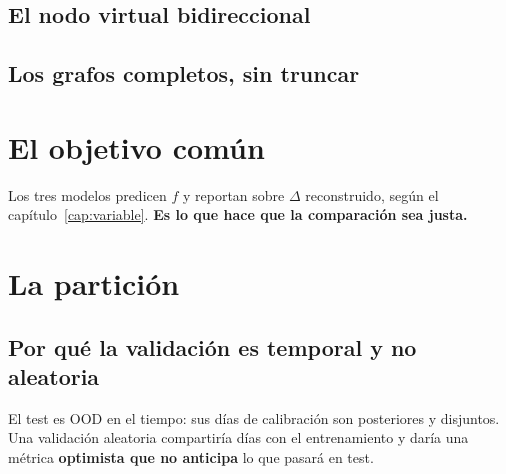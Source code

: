 \subsection{El nodo virtual bidireccional}

\subsection{Los grafos completos, sin truncar}


\section{El objetivo común}
\label{sec:objetivo_comun}
Los tres modelos predicen $f$ y reportan sobre $\Delta$ reconstruido, según el
capítulo~\ref{cap:variable}. \textbf{Es lo que hace que la comparación sea justa.}

\section{La partición}
\label{sec:particion}
\subsection{Por qué la validación es temporal y no aleatoria}
El test es OOD en el tiempo: sus días de calibración son posteriores y disjuntos. Una
validación aleatoria compartiría días con el entrenamiento y daría una métrica
\textbf{optimista que no anticipa} lo que pasará en test.

